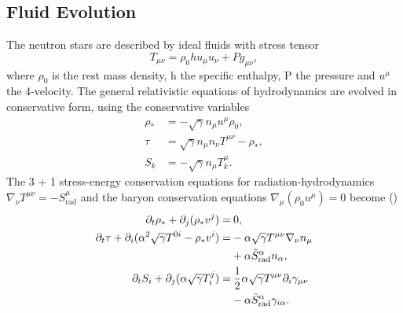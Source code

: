 
\subsection{Fluid Evolution}

The neutron stars are described by ideal fluids with stress tensor
\begin{equation}
T_{\mu\nu} = \rho_0 h u_\mu u_\nu + Pg_{\mu\nu},
\end{equation}
%
where $\rho_0$ is the rest mass density, h the specific enthalpy, P the pressure and $u^\mu$ the 4-velocity. The general relativistic equations of hydrodynamics are evolved in conservative form, using the conservative variables
%
\begin{align}
  \rho_* &= -\sqrt{\gamma}n_\mu u^\mu \rho_0, \\
  \tau &= \sqrt{\gamma}n_\mu n_\nu T^{\mu\nu} - \rho_*, \\
  S_k &= -\sqrt{\gamma}n_\mu T^\mu_k.
\end{align}
%
The 3 + 1 stress-energy conservation equations for radiation-hydrodynamics $\nabla_\nu T^{\mu\nu} = -S^\mu_\text{rad}$ and the baryon conservation equations $\nabla_\mu (\rho_0 u^\mu) = 0$ become (\cite{shibata2011truncated})
%
%
\begin{align}
  \partial_t \rho_* + \partial_j(\rho_* v^j) =&\:0, \\
  \partial_t \tau + \partial_i (\alpha^2 \sqrt{\gamma} T^{0i} - \rho_* v^i) =& -\alpha \sqrt{\gamma} T^{\mu\nu} \nabla_\nu n_\mu\\
  &+ \alpha \tilde S_\text{rad}^\alpha n_\alpha, \notag\\
  \partial_t S_i + \partial_j(\alpha\sqrt{\gamma}T^j_i) =&\: \frac{1}{2}\alpha \sqrt{\gamma} T^{\mu\nu} \partial_i \gamma_{\mu\nu} \\
  &- \alpha \tilde S_\text{rad}^\alpha \gamma_{i\alpha}.\notag
\end{align}

